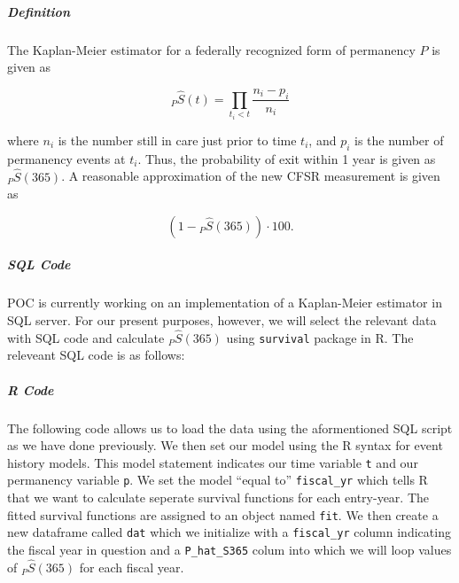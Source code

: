 \documentclass[12pt]{article}\usepackage[]{graphicx}\usepackage[]{color}
\begin{document}
\subparagraph{Definition} The Kaplan-Meier estimator for a federally recognized form of permanency $P$ is given as

\begin{equation}\label{eq:KM}
{}_P\hat S(t) = \prod\limits_{t_i<t} \frac{n_i-p_{i}}{n_i}
\end{equation}
 
where $n_{i}$ is the number still in care just prior to time $t_{i}$, and $p_{i}$ is the number of permanency events at $t_{i}$. Thus, the probability of exit within 1 year is given as ${}_P\hat S(365)$. A reasonable approximation of the new CFSR measurement is given as

\begin{equation}\label{eq:KM}
(1 - {}_P\hat S(365)) \cdot 100. 
\end{equation}

\subparagraph{SQL Code}

POC is currently working on an implementation of a Kaplan-Meier estimator in SQL server. For our present purposes, however, we will select the relevant data with SQL code and calculate ${}_P\hat S(365)$ using \texttt{survival} package in R. The releveant SQL code is as follows: 



\subparagraph{R Code}

The following code allows us to load the data using the aformentioned SQL script as we have done previously. We then set our model using the R syntax for event history models. This model statement indicates our time variable \texttt{t} and our permanency variable \texttt{p}. We set the model ``equal to'' \texttt{fiscal\_yr} which tells R that we want to calculate seperate survival functions for each entry-year. The fitted survival functions are assigned to an object named \texttt{fit}. We then create a new dataframe called \texttt{dat} which we initialize with a \texttt{fiscal\_yr} column indicating the fiscal year in question and a \texttt{P\_hat\_S365} colum into which we will loop values of ${}_P\hat S(365)$ for each fiscal year. 
\end{document}
